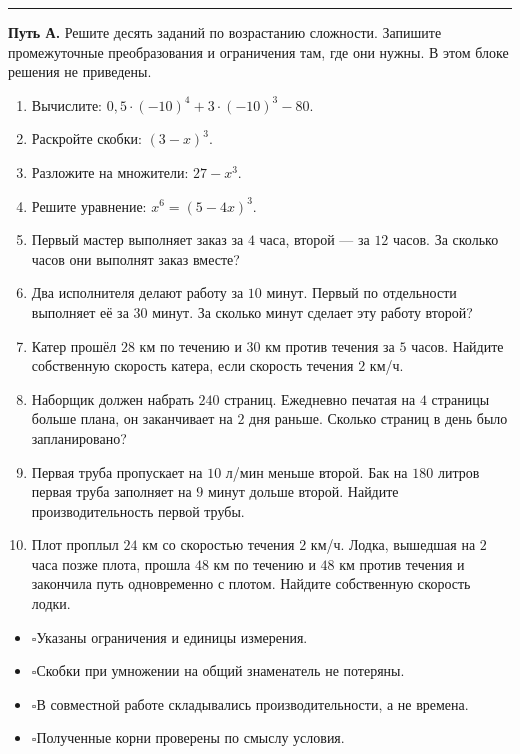 \documentclass[a4paper,12pt]{article}
\newcommand{\checkitem}{\ensuremath{\square}\enspace}
\newcommand{\sectionline}{\vspace{0.3em}\noindent\textcolor{accent}{\rule{\linewidth}{0.5pt}}\vspace{0.2em}}
\renewcommand{\section}[1]{\Needspace{5\baselineskip}\par\vspace{0.65em}\noindent{\Large\color{darkaccent}\bfseries #1}\par\vspace{0.15em}\sectionline}
\newcommand{\subhead}[1]{\par\vspace{0.4em}{\large\bfseries #1}\par\vspace{0.06em}}
\begin{document}
\section{Тренировочный блок}
\textbf{Путь А.} Решите десять заданий по возрастанию сложности. Запишите промежуточные преобразования и ограничения там, где они нужны. В этом блоке решения не приведены.

\begin{enumerate}[leftmargin=8mm,itemsep=0.55em]
\item Вычислите: \(0{,}5\cdot(-10)^4+3\cdot(-10)^3-80\).
\item Раскройте скобки: \((3-x)^3\).
\item Разложите на множители: \(27-x^3\).
\item Решите уравнение: \(x^6=(5-4x)^3\).
\item Первый мастер выполняет заказ за \(4\) часа, второй — за \(12\) часов. За сколько часов они выполнят заказ вместе?
\item Два исполнителя делают работу за \(10\) минут. Первый по отдельности выполняет её за \(30\) минут. За сколько минут сделает эту работу второй?
\item Катер прошёл \(28\) км по течению и \(30\) км против течения за \(5\) часов. Найдите собственную скорость катера, если скорость течения \(2\) км/ч.
\item Наборщик должен набрать \(240\) страниц. Ежедневно печатая на \(4\) страницы больше плана, он заканчивает на \(2\) дня раньше. Сколько страниц в день было запланировано?
\item Первая труба пропускает на \(10\) л/мин меньше второй. Бак на \(180\) литров первая труба заполняет на \(9\) минут дольше второй. Найдите производительность первой трубы.
\item Плот проплыл \(24\) км со скоростью течения \(2\) км/ч. Лодка, вышедшая на \(2\) часа позже плота, прошла \(48\) км по течению и \(48\) км против течения и закончила путь одновременно с плотом. Найдите собственную скорость лодки.
\end{enumerate}
\vspace{0.4em}
\subhead{Перед сверкой ответов}
\begin{itemize}[itemsep=0pt,topsep=0pt]
\item \checkitem Указаны ограничения и единицы измерения.
\item \checkitem Скобки при умножении на общий знаменатель не потеряны.
\item \checkitem В совместной работе складывались производительности, а не времена.
\item \checkitem Полученные корни проверены по смыслу условия.
\end{itemize}
\end{document}

